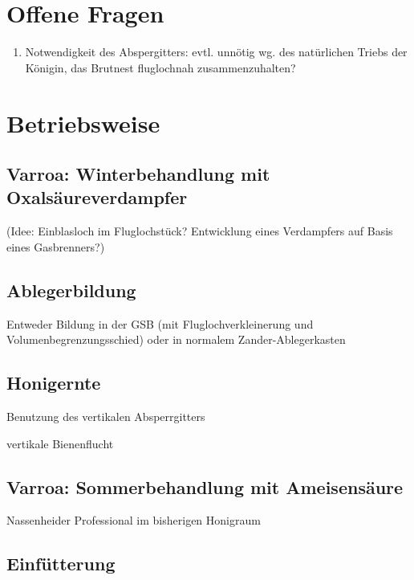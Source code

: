 \documentclass[12pt,a4paper,ngerman]{scrartcl}
\begin{document}
\section{Offene Fragen}

\begin{enumerate}
\item Notwendigkeit des Abspergitters: evtl. unnötig wg. des natürlichen Triebs der Königin, das Brutnest fluglochnah zusammenzuhalten?
\end{enumerate}


\section{Betriebsweise}

\subsection{Varroa: Winterbehandlung mit Oxalsäureverdampfer}

(Idee: Einblasloch im Fluglochstück? Entwicklung eines Verdampfers auf Basis eines Gasbrenners?)


\subsection{Ablegerbildung}

Entweder Bildung in der GSB (mit Fluglochverkleinerung und Volumenbegrenzungsschied)
oder in normalem Zander-Ablegerkasten


\subsection{Honigernte}

Benutzung des vertikalen Absperrgitters

vertikale Bienenflucht


\subsection{Varroa: Sommerbehandlung mit Ameisensäure}

Nassenheider Professional im bisherigen Honigraum


\subsection{Einfütterung}
\end{document}
